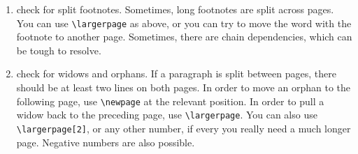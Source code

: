 \begin{enumerate}
separate \texttt{[p]}age. You can use several of these options, e.g. \verb+\begin{figure}[ht]+ to place a figure either exactly where it is in the document or on the top of this page or another page.  A figure should generally appear as close to the text which refers to it, either on the same page or a following page. If the figure is on a following page, it is preferable that the reader does not have to turn the page. Next to the parameters \verb+[hbpt]+, you can also change the position of the relevant lines of source code to ``move'' a figure to the top or bottom of another page of the pdf. Finally, you can also slightly change the size of the figure or table to be able to fit it on the desired page.
                                                                            
\item check for split footnotes. Sometimes, long footnotes are split across pages. You can use \verb+\largerpage+ as above, or you can try to move the word with the footnote to another page. Sometimes, there are chain dependencies, which can be tough to resolve.


\item check for widows and orphans. If a paragraph is split between pages, there should be at least two lines on both pages. In order to move  an orphan to the following page, use \verb+\newpage+ at the relevant position. In order to pull a widow back to the preceding page, use \verb+\largerpage+. You can also use \verb+\largerpage[2]+, or any other number, if every you really need a much longer page. Negative numbers are also possible. 

\end{enumerate} 

